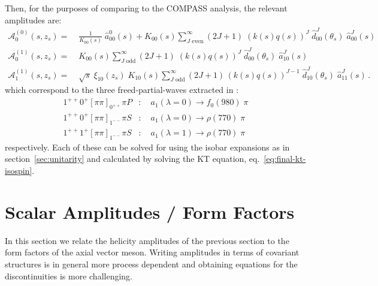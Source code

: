 \documentclass[10pt, aps,prd,amsmath,amssymb,superscriptaddress,onecolumn,
nofootinbib,showpacs,preprintnumbers]{revtex4-1}
\begin{document}
Then, for the purposes of comparing to the COMPASS analysis, the relevant amplitudes are:
  \begin{align}
    \label{eq:relevant-pw}
    \mathcal{A}^{(0)}_0(s,z_s) =& \;  \frac{1}{K_{00}(s)} \; \hat{a}^0_{00}(s) + K_{00}(s) \sum_{J \text{ even}}^\infty (2J+1) \; (k(s)q(s))^{J} \; \hat{d}^J_{00}(\theta_s) \; \hat{a}^J_{00}(s)\nonumber \\
    \mathcal{A}^{(1)}_0(s,z_s) =& \; K_{00}(s) \sum_{J \text{ odd}}^\infty (2J+1) \; (k(s)q(s))^{J} \; \hat{d}^J_{00}(\theta_s) \; \hat{a}^J_{10}(s) \\
    \mathcal{A}^{(1)}_1(s,z_s) =& \; \sqrt{s} \;    \xi_{10}(z_s) \; K_{10}(s) \sum_{J \text{ odd}}^\infty (2J+1) \, (k(s)q(s))^{J-1} \; \hat{d}^J_{10}(\theta_s) \; \hat{a}^J_{11}(s) \, . \nonumber
  \end{align}
which correspond to the three freed-partial-waves extracted in \cite{COMPASS-Swave}:
  \begin{align}
    1^{++} 0^+ [\pi\pi]_{0^{++}} \pi P & : \quad a_1(\lambda = 0) \to f_0(980) \; \pi \nonumber \\
    1^{++} 0^+ [\pi\pi]_{1^{--}} \pi S  & : \quad a_1(\lambda = 0) \to \rho(770) \; \pi \\
    1^{++} 1^+ [\pi\pi]_{1^{--}} \pi S & : \quad a_1(\lambda = 1) \to \rho(770) \; \pi \nonumber
  \end{align}
respectively. Each of these can be solved for using the isobar expansions as in section~\ref{sec:unitarity} and calculated by solving the KT equation, eq.~\ref{eq:final-kt-isospin}.
\section{Scalar Amplitudes / Form Factors}
In this section we relate the helicity amplitudes of the previous section to the form factors of the axial vector meson. Writing amplitudes in terms of covariant structures is in general more process dependent and obtaining equations for the discontinuities is more challenging.
\end{document}
